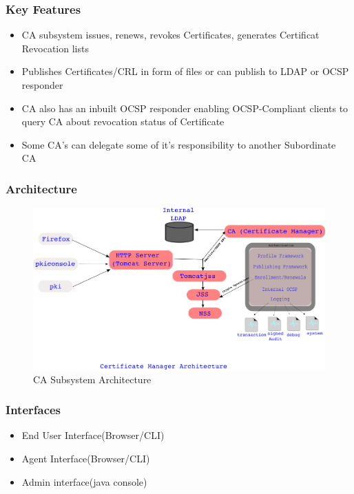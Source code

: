 \documentclass[a4paper]{article}
\begin{document}
\subsubsection{Key Features}
    \begin{itemize}
        \item CA subsystem issues, renews, revokes Certificates, generates Certificat Revocation lists
        \item Publishes Certificates/CRL in form of files or can publish to LDAP or OCSP responder
        \item CA also has an inbuilt OCSP responder enabling OCSP-Compliant clients to query CA about revocation status of Certificate
        \item Some CA's can delegate some of it's responsibility to another Subordinate CA
    \end{itemize}
\subsubsection{Architecture}
     \begin{figure}[ht!]
          \centering
          \includegraphics[width=120mm]{CA-subsystem-Arch3.png}
          \caption{CA Subsystem Architecture}
    \end{figure}
\subsubsection{Interfaces}
    \begin{itemize}
        \item End User Interface(Browser/CLI)
        \item Agent Interface(Browser/CLI)
        \item Admin interface(java console)
    \end{itemize}
\end{document}
